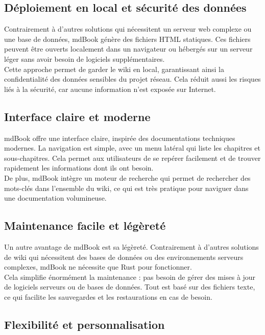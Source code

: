 \documentclass{article}
\begin{document}
\subsection{Déploiement en local et sécurité des données}
Contrairement à d’autres solutions qui nécessitent un serveur web complexe ou une base de données, mdBook génère des fichiers HTML statiques. Ces fichiers peuvent être ouverts localement dans un navigateur ou hébergés sur un serveur léger sans avoir besoin de logiciels supplémentaires.\\

Cette approche permet de garder le wiki en local, garantissant ainsi la confidentialité des données sensibles du projet réseau. Cela réduit aussi les risques liés à la sécurité, car aucune information n’est exposée sur Internet.

    \subsection{Interface claire et moderne}

    mdBook offre une interface claire, inspirée des documentations techniques modernes. La navigation est simple, avec un menu latéral qui liste les chapitres et sous-chapitres. Cela permet aux utilisateurs de se repérer facilement et de trouver rapidement les informations dont ils ont besoin.\\

De plus, mdBook intègre un moteur de recherche qui permet de rechercher des mots-clés dans l’ensemble du wiki, ce qui est très pratique pour naviguer dans une documentation volumineuse.

    \subsection{Maintenance facile et légèreté}
    Un autre avantage de mdBook est sa légèreté. Contrairement à d’autres solutions de wiki qui nécessitent des bases de données ou des environnements serveurs complexes, mdBook ne nécessite que Rust pour fonctionner.\\

Cela simplifie énormément la maintenance : pas besoin de gérer des mises à jour de logiciels serveurs ou de bases de données. Tout est basé sur des fichiers texte, ce qui facilite les sauvegardes et les restaurations en cas de besoin.

\subsection{Flexibilité et personnalisation}
\end{document}
